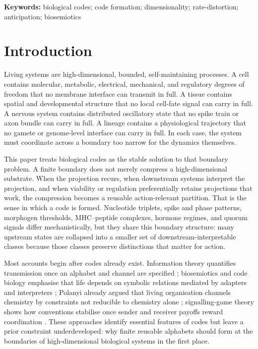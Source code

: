 \documentclass[12pt]{article}
\theoremstyle{definition}
\begin{document}
\noindent\textbf{Keywords:} biological codes; code formation; dimensionality; rate-distortion; anticipation; biosemiotics

\section{Introduction}

Living systems are high-dimensional, bounded, self-maintaining processes. A cell contains molecular, metabolic, electrical, mechanical, and regulatory degrees of freedom that no membrane interface can transmit in full. A tissue contains spatial and developmental structure that no local cell-fate signal can carry in full. A nervous system contains distributed oscillatory state that no spike train or axon bundle can carry in full. A lineage contains a physiological trajectory that no gamete or genome-level interface can carry in full. In each case, the system must coordinate across a boundary too narrow for the dynamics themselves.

This paper treats biological codes as the stable solution to that boundary problem. A finite boundary does not merely compress a high-dimensional substrate. When the projection recurs, when downstream systems interpret the projection, and when viability or regulation preferentially retains projections that work, the compression becomes a reusable action-relevant partition. That is the sense in which a code is formed. Nucleotide triplets, spike and phase patterns, morphogen thresholds, MHC--peptide complexes, hormone regimes, and quorum signals differ mechanistically, but they share this boundary structure: many upstream states are collapsed into a smaller set of downstream-interpretable classes because those classes preserve distinctions that matter for action.

Most accounts begin after codes already exist. Information theory quantifies transmission once an alphabet and channel are specified \citep{shannon1948,coverthomas2006}; biosemiotics and code biology emphasise that life depends on symbolic relations mediated by adapters and interpreters \citep{pattee1969,pattee2001,barbieri2003,barbieri2015,hoffmeyer2008,emmeche1991}; Polanyi already argued that living organisation channels chemistry by constraints not reducible to chemistry alone \citep{polanyi1968}; signalling-game theory shows how conventions stabilise once sender and receiver payoffs reward coordination \citep{lewis1969,skyrms2010}. These approaches identify essential features of codes but leave a prior constraint underdeveloped: why finite reusable alphabets should form at the boundaries of high-dimensional biological systems in the first place.
\end{document}
